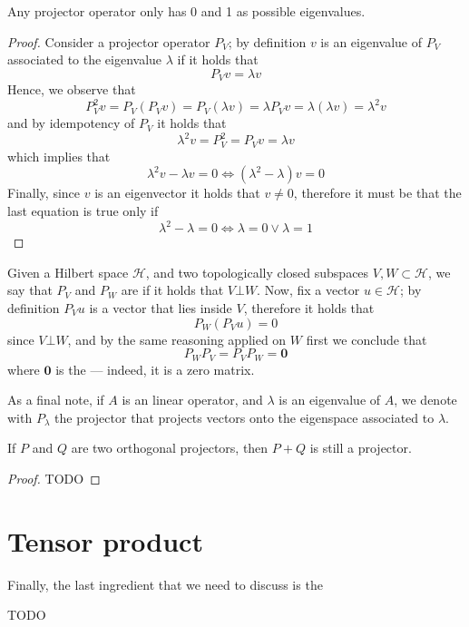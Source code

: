 \documentclass[a4paper, 12pt]{report}
\begin{document}
\begin{framedprop}{}
    Any projector operator only has 0 and 1 as possible eigenvalues.
\end{framedprop}

\begin{proof}
    Consider a projector operator $P_V$; by definition $v$ is an eigenvalue of $P_V$ associated to the eigenvalue $\lambda$ if it holds that $$P_Vv = \lambda v$$ Hence, we observe that $$P_V^2 v = P_V (P_V v) = P_V(\lambda v) = \lambda P_Vv = \lambda(\lambda v) = \lambda^2 v$$ and by idempotency of $P_V$ it holds that $$\lambda^2 v = P_V^2 = P_Vv = \lambda v$$ which implies that $$\lambda^2v - \lambda v = 0 \iff (\lambda^2 - \lambda)v = 0$$ Finally, since $v$ is an eigenvector it holds that $v \neq 0$, therefore it must be that the last equation is true only if $$\lambda^2 - \lambda = 0 \iff \lambda = 0 \lor \lambda = 1$$
\end{proof}

Given a Hilbert space $\mathcal H$, and two topologically closed subspaces $V, W \subset \mathcal H$, we say that $P_V$ and $P_W$ are  if it holds that $V \bot W$. Now, fix a vector $u \in \mathcal H$; by definition $P_Vu$ is a vector that lies inside $V$, therefore it holds that $$P_W(P_Vu) = 0$$ since $V \bot W$, and by the same reasoning applied on $W$ first we conclude that $$P_WP_V = P_VP_W = \mathbf 0$$ where $\mathbf 0$ is the  --- indeed, it is a zero matrix.

As a final note, if $A$ is an linear operator, and $\lambda$ is an eigenvalue of $A$, we denote with $P_\lambda$ the projector that projects vectors onto the eigenspace associated to $\lambda$.

\begin{framedprop}{}
    If $P$ and $Q$ are two orthogonal projectors, then $P + Q$ is still a projector.
\end{framedprop}

\begin{proof}
    TODO 
\end{proof}

\section{Tensor product}

Finally, the last ingredient that we need to discuss is the 

TODO 
\end{document}
